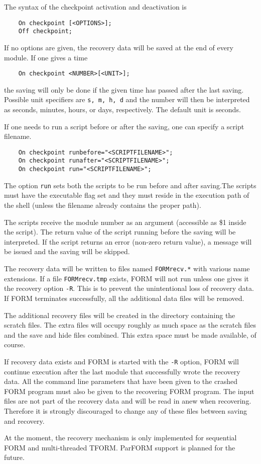 The syntax of the checkpoint activation and deactivation is
\begin{verbatim}
    On checkpoint [<OPTIONS>];
    Off checkpoint;
\end{verbatim}

If no options are given, the recovery data will be saved at the end of every
module. If one gives a time
\begin{verbatim}
    On checkpoint <NUMBER>[<UNIT>];
\end{verbatim}
the saving will only be done if the given time has passed after the last 
saving. Possible unit specifiers are {\tt s, m, h, d} and the number will 
then be interpreted as seconds, minutes, hours, or days, respectively. The 
default unit is seconds.

If one needs to run a script before or after the saving,
one can specify a script filename.
\begin{verbatim}
    On checkpoint runbefore="<SCRIPTFILENAME>";
    On checkpoint runafter="<SCRIPTFILENAME>";
    On checkpoint run="<SCRIPTFILENAME>";
\end{verbatim}
The option {\tt run} sets both the scripts to be run before and 
after saving.The scripts must have the executable flag set and they must 
reside in the execution path of the shell (unless the filename 
already contains the proper path).

The scripts receive the module number as an argument 
(accessible as \$1 inside the script). The return value of the script 
running before the saving will be interpreted. If the script returns an 
error (non-zero return value), a message will be issued and the saving will 
be skipped. 

The recovery data will be written to files named {\tt FORMrecv.*} with 
various name extensions. If a file {\tt FORMrecv.tmp} exists, FORM will not 
run unless one gives it the recovery option
{\tt -R}. This is to prevent the unintentional loss of recovery data. If 
FORM terminates successfully, all the additional data files will be removed.

The additional recovery files will be created in the directory containing 
the scratch files.  The extra files will occupy roughly as much space as 
the scratch files and the save and 
hide files combined. This extra space must be made 
available, of course.

If recovery data exists and FORM is started with the {\tt -R} option, FORM 
will continue execution after the last module that successfully wrote the 
recovery data. All the command line parameters that have been given to the 
crashed FORM program must also be given to the 
recovering FORM program. The input files are not part of the recovery data 
and will be read in anew when recovering. Therefore it is strongly 
discouraged to change any of these files between saving and recovery.

At the moment, the recovery mechanism is only implemented for sequential FORM
and multi-threaded TFORM.  ParFORM support is planned for the future.

